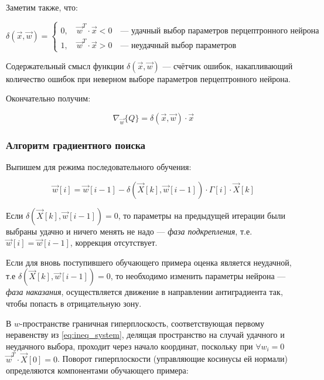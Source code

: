 \documentclass{article}
\numberwithin{equation}{subsection}
\begin{document}
Заметим также, что:

\begin{equation}
    \delta (\vec{x}, \vec{w}) =
    \begin{cases}
        0, \quad \vec{w}^T \cdot \vec{x} < 0 \quad \textrm{--- удачный выбор параметров перцептронного нейрона}\\
        1, \quad \vec{w}^T \cdot \vec{x} > 0 \quad \textrm{--- неудачный выбор параметров}
    \end{cases}
\end{equation}

Содержательный смысл функции $\delta (\vec{x}, \vec{w})$ --- счётчик ошибок,
накапливающий количество ошибок при неверном выборе параметров перцептронного нейрона.

Окончательно получим:

\begin{equation}
    \nabla_{\vec{w}} \{Q\} = \delta (\vec{x}, \vec{w}) \cdot \vec{x}
\end{equation}



\subsubsection{Алгоритм градиентного поиска}

Выпишем для режима последовательного обучения:

\begin{equation}
    \vec{w}[i] = \vec{w}[i-1] - \delta (\vec{X}[k], \vec{w}[i-1]) \cdot \Gamma[i] \cdot \vec{X}[k]
\end{equation}

Если $\delta (\vec{X}[k], \vec{w}[i-1]) = 0$, то параметры на предыдущей итерации были
выбраны удачно и ничего менять не надо --- \textit{фаза подкрепления}, т.е.
$\vec{w}[i] = \vec{w}[i-1]$, коррекция отсутствует.

Если для вновь поступившего обучающего примера оценка является неудачной, т.е
$\delta (\vec{X}[k], \vec{w}[i-1]) = 0$, то необходимо изменить параметры нейрона ---
\textit{фаза наказания}, осуществляется движение в направлении антиградиента так, чтобы
попасть в отрицательную зону.

В $w$-пространстве граничная гиперплоскость, соответствующая первому неравенству 
из \ref{eq:ineq_system}, делящая пространство на случай удачного и неудачного выбора,
проходит через начало координат, поскольку при $\forall w_i = 0$ 
$\vec{w}^T \cdot \vec{X}[0] = 0$. Поворот гиперплоскости (управляющие косинусы ей нормали)
определяются компонентами обучающего примера: 
\end{document}
